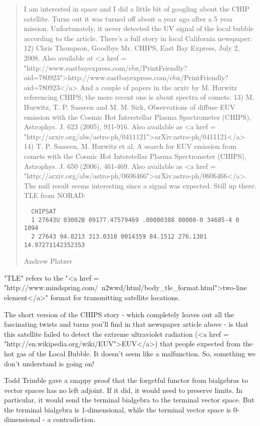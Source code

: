 \begin{quote}
  I am interested in space and I did a little bit of googling about
  the CHIP satellite. Turns out it was turned off about a year ago after
  a 5 year mission. Unfortunately, it never detected the UV signal of
  the local bubble according to the article. There's a full story in
  local California newspaper:
  12) Chris Thompson, Goodbye Mr. CHIPS, East Bay Express, July 2, 2008.
  Also available at <a href = "http://www.eastbayexpress.com/ebx/PrintFriendly?oid=780923">http://www.eastbayexpress.com/ebx/PrintFriendly?oid=780923</a>
  And a couple of papers in the arxiv by M. Hurwitz referencing CHIPS;
  the more recent one is about spectra of comets:
  13) M. Hurwitz, T. P. Sasseen and M. M. Sirk, Observations of
  diffuse EUV emission with the Cosmic Hot Interstellar Plasma
  Spectrometer (CHIPS), Astrophys. J. 623 (2005), 911-916.  Also
  available as <a href = "http://arxiv.org/abs/astro-ph/0411121">arXiv:astro-ph/0411121</a>
  14) T. P. Sasseen, M. Hurwitz et al, A search for EUV emission from
  comets with the Cosmic Hot Interstellar Plasma Spectrometer (CHIPS),
  Astrophys. J. 650 (2006), 461-469.  Also available as 
  <a href = "http://arxiv.org/abs/astro-ph/0606466">arXiv:astro-ph/0606466</a>.
  The null result seems interesting since a signal was expected.
  Still up there. TLE from NORAD:
\begin{verbatim}
  CHIPSAT
  1 27643U 03002B 09177.47579469 .00000388 00000-0 34685-4 0 1094
  2 27643 94.0213 313.0310 0014359 84.1512 276.1301 14.97271142352353
\end{verbatim}
    
  Andrew Platzer
\end{quote}

"TLE" refers to the "<a href =
"http://www.mindspring.com/~n2wwd/html/body_tle_format.html">two-line
element</a>" format for transmitting satellite locations.

The short version of the CHIPS story - which completely leaves out all
the fascinating twists and turns you'll find in that newspaper article
above - is that this satellite failed to detect the extreme
ultraviolet radiation (<a href =
"http://en.wikipedia.org/wiki/EUV">EUV</a>) that people expected from
the hot gas of the Local Bubble.  It doesn't seem like a malfunction.
So, something we don't understand is going on!

Todd Trimble gave a snappy proof that the forgetful functor from 
bialgebras to vector spaces has no left adjoint.  If it did, it would
need to preserve limits.  In particular, it would send the 
terminal bialgebra to the terminal vector space.  But the terminal
bialgebra is 1-dimensional, while the terminal vector space is 
0-dimensional - a contradiction.  

